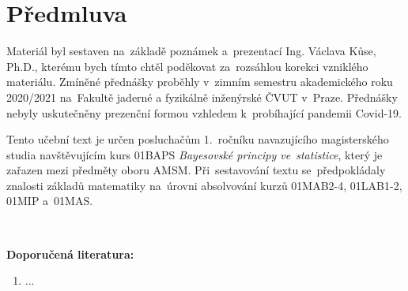 \chapter*{Předmluva}

Materiál byl sestaven na~základě poznámek a~prezentací Ing. Václava Kůse, Ph.D., kterému bych tímto chtěl poděkovat za~rozsáhlou korekci vzniklého materiálu. Zmíněné přednášky proběhly v~zimním semestru akademického roku 2020/2021 na~Fakultě jaderné a
fyzikálně inženýrské ČVUT v~Praze. Přednášky nebyly uskutečněny prezenční formou vzhledem k~probíhající pandemii Covid-19. 

Tento učební text je určen posluchačům 1.~ročníku navazujícího magisterského studia navštěvujícím kurs 01BAPS\emph{ Bayesovské principy ve~statistice}, který je zařazen
mezi předměty oboru AMSM. Při~sestavování textu se~předpokládaly znalosti základů matematiky na~úrovni absolvování kurzů 01MAB2-4, 01LAB1-2, 01MIP a~01MAS.

~

\textbf{Doporučená literatura:}
\begin{enumerate}[(1)]
  \item ...
\end{enumerate}
